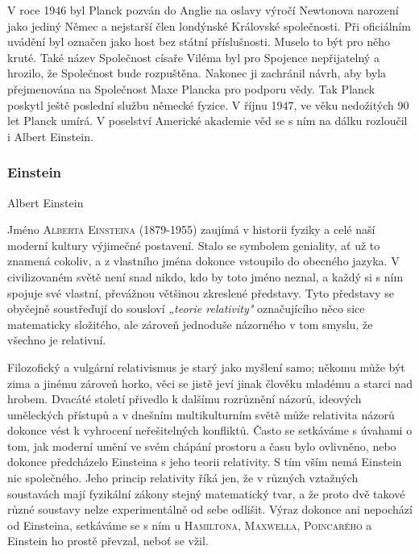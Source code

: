         V roce 1946 byl Planck pozván do Anglie na oslavy výročí Newtonova narození jako jediný
        Němec a nejstarší člen londýnské Královské společnosti. Při oficiálním uvádění byl označen
        jako host bez státní příslušnosti. Muselo to být pro něho kruté. Také název Společnost
        císaře Viléma byl pro Spojence nepřijatelný a hrozilo, že Společnost bude rozpuštěna.
        Nakonec ji zachránil návrh, aby byla přejmenována na Společnost Maxe Plancka pro podporu
        vědy. Tak Planck poskytl ještě poslední službu německé fyzice. V říjnu 1947, ve věku
        nedožitých 90 let Planck umírá. V poselství Americké akademie věd se s ním na dálku
        rozloučil i Albert Einstein.

      \subsubsection{Einstein}\label{fyz:IchapIIsecIVssecIsssecVII}
        \epigraph{\emph{}}{Albert Einstein}

        Jméno \textsc{Alberta Einsteina} (1879-1955) zaujímá v historii fyziky a celé naší moderní
        kultury výjimečné postavení. Stalo se symbolem geniality, ať už to znamená cokoliv, a z
        vlastního jména dokonce vstoupilo do obecného jazyka. V civilizovaném světě není snad nikdo,
        kdo by toto jméno neznal, a každý si s ním spojuje své vlastní, převážnou většinou zkreslené
        představy. Tyto představy se obyčejně soustřeďují do sousloví \emph{„teorie relativity"}
        označujícího něco sice matematicky složitého, ale zároveň jednoduše názorného v tom smyslu,
        že všechno je relativní.

        Filozofický a vulgární relativismus je starý jako myšlení samo; někomu může být zima a
        jinému zároveň horko, věci se jistě jeví jinak člověku mladému a starci nad hrobem. Dvacáté
        století přivedlo k dalšímu rozrůznění názorů, ideových uměleckých přístupů a v dnešním
        multikulturním světě může relativita názorů dokonce vést k vyhrocení neřešitelných
        konfliktů. Často se setkáváme s úvahami o tom, jak moderní umění ve svém chápání prostoru a
        času bylo ovlivněno, nebo dokonce předcházelo Einsteina s jeho teorii relativity. S tím vším
        nemá Einstein nic společného. Jeho princip relativity říká jen, že v různých vztažných
        soustavách mají fyzikální zákony stejný matematický tvar, a že proto dvě takové různé
        soustavy nelze experimentálně od sebe odlišit. Výraz  dokonce ani
        nepochází od Einsteina, setkáváme se s ním u \textsc{Hamiltona}, \textsc{Maxwella},
        \textsc{Poincarého} a Einstein ho prostě převzal, neboť se vžil.

